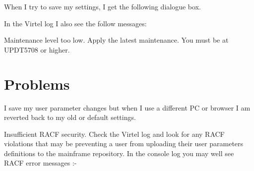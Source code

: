 \documentclass[letterpaper,10pt,english]{sphinxmanual}
\begin{document}
When I try to save my settings, I get the following dialogue box.


In the Virtel log I also see the follow messages:

\begin{sphinxVerbatim}[commandchars=\\\{\}]
         
             
        
          
     
           
\end{sphinxVerbatim}


Maintenance level too low. Apply the latest maintenance. You must be at UPDT5708 or higher.

\newpage


\section{Problems}
\label{\detokenize{TN202002:problems}}

I save my user parameter changes but when I use a different PC or browser I am reverted back to my old or default settings.


Insufficient RACF security. Check the Virtel log and look for any RACF violations that may be preventing a user from uploading their user parameters definitions to the mainframe repository. In the console log you may well see RACF error messages :-
\end{document}
